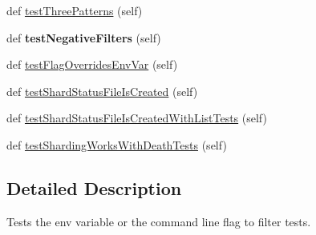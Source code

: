 \begin{DoxyCompactItemize}
\item 
def \hyperlink{classtests_1_1libs_1_1googletest-master_1_1googletest_1_1test_1_1googletest-filter-unittest_1_1GTestFilterUnitTest_a7c1bccbaaffb092bba89552c35fa7415}{test\+Three\+Patterns} (self)
\item 
\mbox{\label{classtests_1_1libs_1_1googletest-master_1_1googletest_1_1test_1_1googletest-filter-unittest_1_1GTestFilterUnitTest_a30806f7995bd6e329ebcb52e2b25988b}} 
def {\bfseries test\+Negative\+Filters} (self)
\item 
def \hyperlink{classtests_1_1libs_1_1googletest-master_1_1googletest_1_1test_1_1googletest-filter-unittest_1_1GTestFilterUnitTest_af3ace21cd484e146e4fdd72d2c774994}{test\+Flag\+Overrides\+Env\+Var} (self)
\item 
def \hyperlink{classtests_1_1libs_1_1googletest-master_1_1googletest_1_1test_1_1googletest-filter-unittest_1_1GTestFilterUnitTest_a74ad820543f697df67c454c35d4dd33b}{test\+Shard\+Status\+File\+Is\+Created} (self)
\item 
def \hyperlink{classtests_1_1libs_1_1googletest-master_1_1googletest_1_1test_1_1googletest-filter-unittest_1_1GTestFilterUnitTest_a42fad84e6667802a0ae7a792cd2b9a50}{test\+Shard\+Status\+File\+Is\+Created\+With\+List\+Tests} (self)
\item 
def \hyperlink{classtests_1_1libs_1_1googletest-master_1_1googletest_1_1test_1_1googletest-filter-unittest_1_1GTestFilterUnitTest_afa168956f49f287e4aa427ee333f8130}{test\+Sharding\+Works\+With\+Death\+Tests} (self)
\end{DoxyCompactItemize}


\subsection{Detailed Description}
\begin{DoxyVerb}Tests the env variable or the command line flag to filter tests.\end{DoxyVerb}
 

